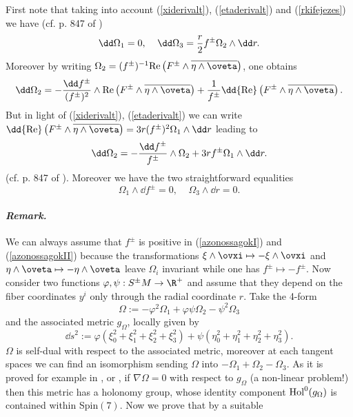 \documentclass[a4paper,12pt,draft]{article}
\newenvironment{remark}{\paragraph{\it Remark.}}{\vskip0.4cm}
\begin{document}
First note that taking into account (\ref{xiderivalt}), 
(\ref{etaderivalt}) and (\ref{rkifejezes}) we have (cf. p. 847 of
\cite{bry-sal})
\begin{equation}
\dd\Omega_1=0,\:\:\:\:\:\dd\Omega_3 ={r\over 2}f^\pm\Omega_2\wedge\dd r. 
\label{azonossagokI}
\end{equation}
Moreover by writing $\Omega_2=(f^\pm )^{-1}{\rm
Re}\left( F^\pm\wedge\overline{\eta\wedge\oveta}\right)$, one obtains
\[\dd\Omega_2= -{\dd f^\pm\over (f^\pm)^2}\wedge{\rm
Re}\left( F^\pm\wedge\overline{\eta\wedge\oveta}\right)+{1\over
f^\pm}\dd{\rm
Re}\left( F^\pm\wedge\overline{\eta\wedge\oveta}\right) .\]
But in light of (\ref{xiderivalt}), (\ref{etaderivalt}) we can
write $\dd {\rm Re}\left( F^\pm\wedge\overline{\eta\wedge\oveta}\right)=
3r(f^\pm )^2\Omega_1\wedge\dd r$
leading to 
\begin{equation}
\dd\Omega_2=-{\dd f^\pm\over f^\pm}\wedge\Omega_2 +
3rf^\pm\Omega_1\wedge\dd r.
\label{azonossagokII}
\end{equation}
(cf. p. 847 of \cite{bry-sal}). Moreover we have the two straightforward
equalities
\begin{equation}
\Omega_1\wedge\dd f^\pm =0,\:\:\:\:\:\Omega_3\wedge\dd r=0.
\label{azonossagokIII}
\end{equation}
\begin{remark}
We can always assume that $f^\pm$ is positive
in (\ref{azonossagokI}) and (\ref{azonossagokII}) because the
transformations $\xi\wedge\ovxi\mapsto
-\xi\wedge\ovxi$ and $\eta\wedge\oveta\mapsto -\eta\wedge\oveta$ leave
$\Omega_i$ invariant while one has $f^\pm\mapsto -f^\pm$. 
\end{remark} 
Now consider two functions $\varphi ,\psi : S^\pm M\rightarrow\R^+$ and
assume that they depend on the fiber coordinates $y^i$ only through
the radial coordinate $r$. Take the 4-form
\[\Omega :=-\varphi^2\Omega_1+\varphi\psi\Omega_2-\psi^2\Omega_3\]
and the associated metric $g_\Omega$, locally given by
\[\dd s^2:=\varphi\left(\xi_0^2+\xi_1^2+\xi_2^2+\xi_3^2\right)
+\psi\left(\eta_0^2 +\eta_1^2 +\eta_2^2 +\eta_3^2\right) .\]
$\Omega$ is self-dual with respect to the associated metric, moreover at
each tangent spaces we can find an isomorphism sending 
$\Omega$ into $-\Omega_1+\Omega_2-\Omega_3$. As it is proved for example
in \cite{bry},\cite{bry-sal} or \cite{joy}, if $\nabla\Omega =0$ with
respect to $g_\Omega$ (a non-linear problem!) then this metric has a
holonomy group, whose identity component ${\rm Hol}^0(g_\Omega )$ is
contained within Spin$(7)$. Now we prove that by a suitable
\end{document}
